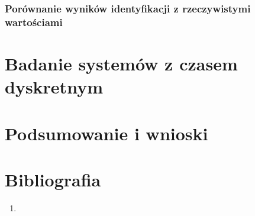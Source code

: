 \documentclass[12pt]{article}
\begin{document}
\subsubsection{Porównanie wyników identyfikacji z rzeczywistymi wartościami}

\section{Badanie systemów z czasem dyskretnym}

\section{Podsumowanie i wnioski}

\section{Bibliografia}
\begin{enumerate}
    \item
\end{enumerate}
\end{document}
